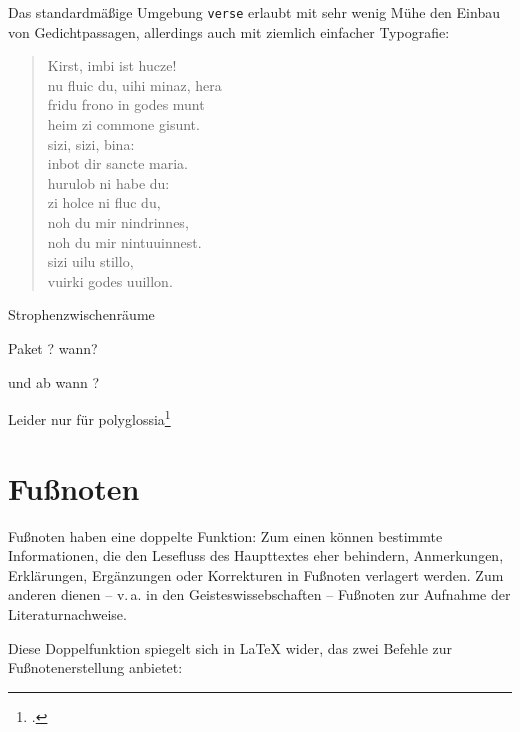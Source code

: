  

Das standardmäßige Umgebung \lstinline/verse/ erlaubt mit sehr wenig Mühe den Einbau von 
Gedichtpassagen, allerdings auch mit ziemlich einfacher Typografie:

\begin{lfgwexample}{}
\begin{verse}
 Kirst, imbi ist hucze! \\
 nu fluic du, uihi minaz, hera \\
 fridu frono in godes munt \\
 heim zi commone gisunt. \\
 sizi, sizi, bina: \\
 inbot dir sancte maria. \\
 hurulob ni habe du: \\
 zi holce ni fluc du, \\
 noh du mir nindrinnes, \\
 noh du mir nintuuinnest. \\
 sizi uilu stillo, \\
 vuirki godes uuillon.
\end{verse}
\end{lfgwexample}

Strophenzwischenräume

Paket ? wann?

und ab wann ?



Leider nur für polyglossia\footcite[33\psqq]{rouquette:2012}


\section{Fußnoten}

Fußnoten haben eine doppelte Funktion: 
Zum einen können bestimmte Informationen, die den Lesefluss des Haupttextes eher behindern,
Anmerkungen, Erklärungen, Ergänzungen oder Korrekturen in Fußnoten verlagert werden.
Zum anderen dienen -- v.\,a. in den Geisteswissebschaften -- Fußnoten zur Aufnahme der 
Literaturnachweise.

Diese Doppelfunktion spiegelt sich in \LaTeX{} wider, das zwei Befehle zur Fußnotenerstellung
anbietet:

